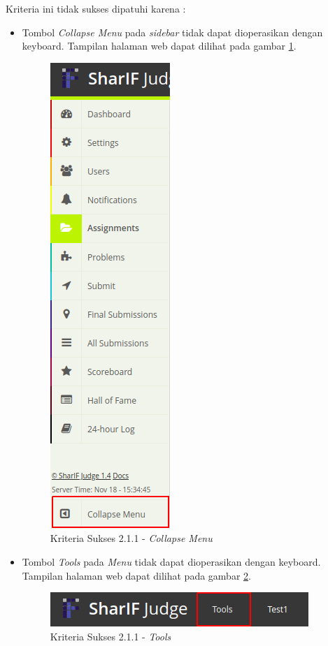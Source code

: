 \documentclass[a4paper,twoside]{article}
\begin{document}
\begin{enumerate}
		Kriteria ini tidak sukses dipatuhi karena :
		\begin{itemize}
			\item Tombol \textit{Collapse Menu} pada \textit{sidebar} tidak dapat dioperasikan dengan keyboard. Tampilan halaman web dapat dilihat pada gambar \ref{fig:kepatuhan_2_1_1_collapse_menu}.
			\begin{figure}[H]
				\centering  
				\includegraphics[scale=0.5]{kepatuhan_2_1_1_collapse_menu}  
				\caption[Kriteria Sukses 2.1.1 - \textit{Collapse Menu}]{Kriteria Sukses 2.1.1 - \textit{Collapse Menu}} 
				\label{fig:kepatuhan_2_1_1_collapse_menu} 
			\end{figure}
			
			\item Tombol \textit{Tools} pada \textit{Menu} tidak dapat dioperasikan dengan keyboard. Tampilan halaman web dapat dilihat pada gambar \ref{fig:kepatuhan_2_1_1_tools}.
			\begin{figure}[H]
				\centering  
				\includegraphics[scale=0.5]{kepatuhan_2_1_1_tools}  
				\caption[Kriteria Sukses 2.1.1 - \textit{Tools}]{Kriteria Sukses 2.1.1 - \textit{Tools}} 
				\label{fig:kepatuhan_2_1_1_tools} 
			\end{figure}
			

\end{itemize}
\end{enumerate}
\end{document}
